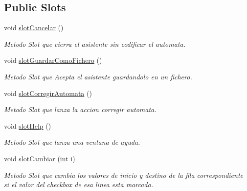 \subsection*{Public Slots}
\begin{DoxyCompactItemize}
\item 
void \hyperlink{classCAsistenteCodificacion_ab7f28d6c6468d1c92a85c655892d31f2}{slot\+Cancelar} ()
\begin{DoxyCompactList}\small\item\em Metodo Slot que cierra el asistente sin codificar el automata. \end{DoxyCompactList}\item 
void \hyperlink{classCAsistenteCodificacion_aeddb96e8728045fe121c2365e4a94cb5}{slot\+Guardar\+Como\+Fichero} ()
\begin{DoxyCompactList}\small\item\em Metodo Slot que Acepta el asistente guardandolo en un fichero. \end{DoxyCompactList}\item 
void \hyperlink{classCAsistenteCodificacion_a3a5f81fcdc2f4531d56d788dc521c798}{slot\+Corregir\+Automata} ()
\begin{DoxyCompactList}\small\item\em Metodo Slot que lanza la accion corregir automata. \end{DoxyCompactList}\item 
void \hyperlink{classCAsistenteCodificacion_a55c2125eb7a4cd4e48647976f21ad165}{slot\+Help} ()
\begin{DoxyCompactList}\small\item\em Metodo Slot que lanza una ventana de ayuda. \end{DoxyCompactList}\item 
void \hyperlink{classCAsistenteCodificacion_ae1301ca578c8c5a8a90f26eb1a99110d}{slot\+Cambiar} (int i)
\begin{DoxyCompactList}\small\item\em Metodo Slot que cambia los valores de inicio y destino de la fila correspondiente si el valor del checkbox de esa linea esta marcado. \end{DoxyCompactList}\end{DoxyCompactItemize}
